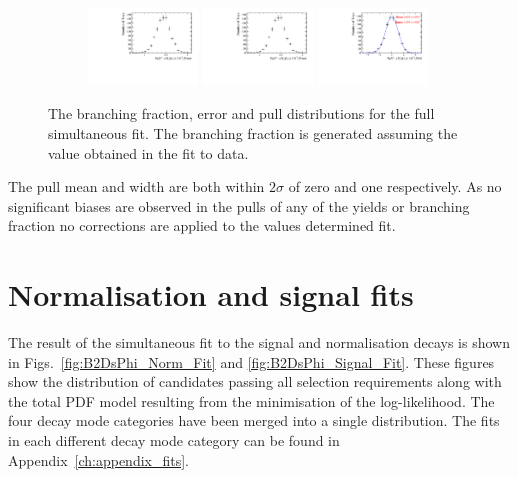 \begin{figure}[!h]
   \centering
   \begin{subfigure}[t]{1.0\textwidth}
      \includegraphics[width=0.32\textwidth]{figs/B2DsPhi/Plots_DsKK_Error_Branching_fraction.pdf}
      \includegraphics[width=0.32\textwidth]{figs/B2DsPhi/Plots_DsKK_Error_Branching_fraction.pdf}
      \includegraphics[width=0.32\textwidth]{figs/B2DsPhi/Plots_DsKK_Pull_Branching_fraction.pdf}
   \end{subfigure}
   \caption{The branching fraction, error and pull distributions for the full simultaneous fit. The branching fraction is generated assuming the value obtained in the fit to data.}
   \label{fig:B2DsPhi_Pulls_signal}
\end{figure}
The pull mean and width are both within $2\sigma$ of zero and one respectively. 
As no significant biases are observed in the pulls of any of the yields or branching fraction no corrections are applied to the values determined fit.


\section{Normalisation and signal fits}

The result of the simultaneous fit to the signal and normalisation decays is shown in Figs.~\ref{fig:B2DsPhi_Norm_Fit} and \ref{fig:B2DsPhi_Signal_Fit}. These figures show the distribution of candidates passing all selection requirements along with the total PDF model resulting from the minimisation of the log-likelihood. The four \Dsp decay mode categories have been merged into a single distribution. The fits in each different \Ds decay mode category can be found in Appendix~\ref{ch:appendix_fits}.



